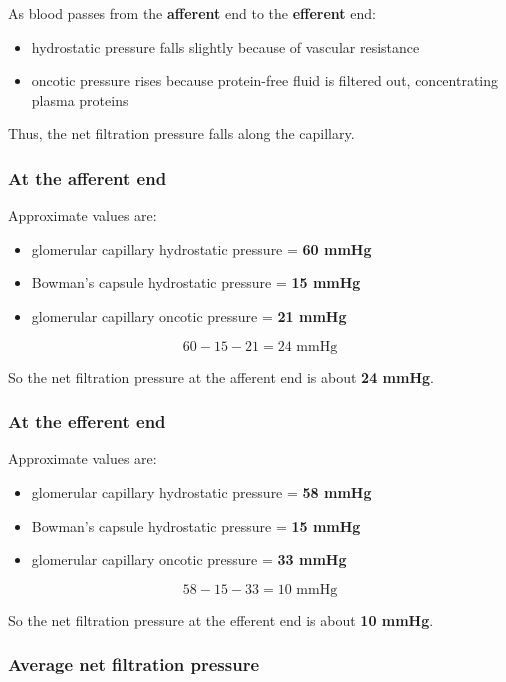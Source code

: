 \documentclass[11pt,a4paper]{article}
\begin{document}
As blood passes from the \textbf{afferent} end to the \textbf{efferent} end:
\begin{itemize}
    \item hydrostatic pressure falls slightly because of vascular resistance
    \item oncotic pressure rises because protein-free fluid is filtered out, concentrating plasma proteins
\end{itemize}

Thus, the net filtration pressure falls along the capillary.

\subsubsection{At the afferent end}

Approximate values are:
\begin{itemize}
    \item glomerular capillary hydrostatic pressure = \textbf{60 mmHg}
    \item Bowman’s capsule hydrostatic pressure = \textbf{15 mmHg}
    \item glomerular capillary oncotic pressure = \textbf{21 mmHg}
\end{itemize}

\[
60 - 15 - 21 = 24 \text{ mmHg}
\]

So the net filtration pressure at the afferent end is about \textbf{24 mmHg}.

\subsubsection{At the efferent end}

Approximate values are:
\begin{itemize}
    \item glomerular capillary hydrostatic pressure = \textbf{58 mmHg}
    \item Bowman’s capsule hydrostatic pressure = \textbf{15 mmHg}
    \item glomerular capillary oncotic pressure = \textbf{33 mmHg}
\end{itemize}

\[
58 - 15 - 33 = 10 \text{ mmHg}
\]

So the net filtration pressure at the efferent end is about \textbf{10 mmHg}.

\subsubsection{Average net filtration pressure}
\end{document}
